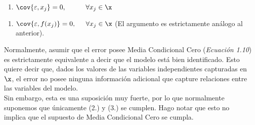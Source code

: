\bigskip
\begin{enumerate}[resume]
    \item $\cov{\varepsilon, x_j}=0, \hspace{1cm} \forall x_j \in \x$
\end{enumerate}


\bigskip
\begin{enumerate}[resume]
    \item $\cov{\varepsilon, f(x_j)}=0, \hspace{0.5cm} \forall x_j \in \x$ \hspace{1cm} (El argumento es estrictamente análogo al anterior).
\end{enumerate}

\bigskip
Normalmente, asumir que el error posee Media Condicional Cero (\textit{Ecuación 1.10}) es estrictamente equivalente a decir que el modelo está bien identificado. Esto quiere decir que, dados los valores de las variables independientes capturadas en $\x$, el error no posee ninguna información adicional que capture relaciones entre las variables del modelo. \\

Sin embargo, esta es una suposición muy fuerte, por lo que normalmente suponemos que únicamente (2.) y (3.) se cumplen. Hago notar que esto no implica que el supuesto de Media Condicional Cero se cumpla. 

